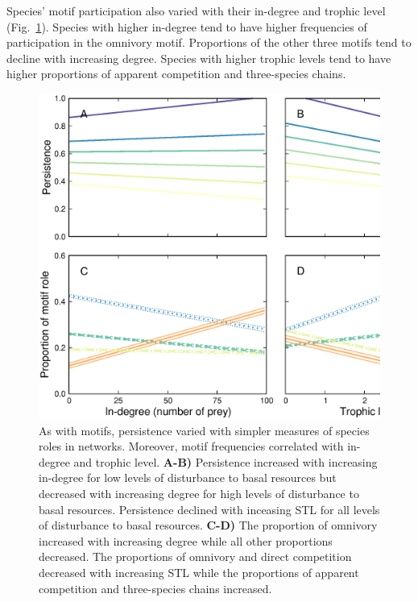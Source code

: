 \documentclass[12pt]{article}
\begin{document}
\begin{spacing}{2.0}
        Species' motif participation also varied with their in-degree and trophic level (Fig.~\ref{fig:motifs_vs_TL_and_deg}).
        Species with higher in-degree tend to have higher frequencies of participation in the omnivory motif. Proportions of the other three motifs tend to decline with increasing degree.
        Species with higher trophic levels tend to have higher proportions of apparent competition and three-species chains. 
        

            \begin{figure}
                \centering
                \includegraphics[width=\textwidth]{figures/roles_vs_TL.eps}
                \caption{As with motifs, persistence varied with simpler measures of species roles in networks. Moreover, motif frequencies correlated with in-degree and trophic level. \textbf{A-B)} Persistence increased with increasing in-degree for low levels of disturbance to basal resources but decreased with increasing degree for high levels of disturbance to basal resources.
                Persistence declined with inceasing STL for all levels of disturbance to basal resources.
                \textbf{C-D)} The proportion of omnivory increased with increasing degree while all other proportions decreased. The proportions of omnivory and direct competition decreased with increasing STL while the proportions of apparent competition and three-species chains increased.}
                \label{fig:motifs_vs_TL_and_deg}
            \end{figure}        
        


\end{spacing}
\end{document}

